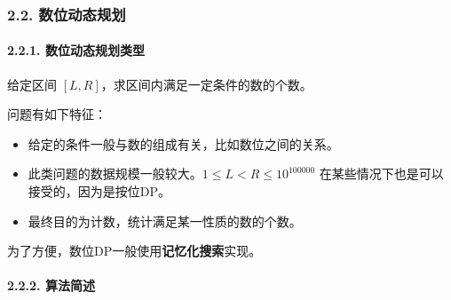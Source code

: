 \begin{Shaded}
\begin{Highlighting}[]
    \OperatorTok{=}\OperatorTok{;}
    \OperatorTok{(}\OperatorTok{=}\OperatorTok{;}\OperatorTok{\textless{}(}\OperatorTok{\textless{}\textless{}}\OperatorTok{);}\OperatorTok{++)}
    \OperatorTok{(}\OperatorTok{=}\OperatorTok{;}\OperatorTok{\textless{}(}\OperatorTok{\textless{}\textless{}}\OperatorTok{);}\OperatorTok{++)}
        \OperatorTok{((}\OperatorTok{\&}\OperatorTok{)==}\OperatorTok{)}\OperatorTok{(}\OperatorTok{,}\OperatorTok{[}\OperatorTok{][}\OperatorTok{]);}
\OperatorTok{\textless{}\textless{}}\OperatorTok{\textless{}\textless{}}\CharTok{\textquotesingle{}}\CharTok{\textquotesingle{}}\OperatorTok{;}
     \OperatorTok{;}
\OperatorTok{\}}
\end{Highlighting}
\end{Shaded}

\subsubsection{2.2. 数位动态规划}

\paragraph{2.2.1. 数位动态规划类型}

给定区间 \([L,R]\)，求区间内满足一定条件的数的个数。

问题有如下特征：

\begin{itemize}
\item
  给定的条件一般与数的组成有关，比如数位之间的关系。
\item
  此类问题的数据规模一般较大。\(1\leq L<R\leq 10^{100000}\)
  在某些情况下也是可以接受的，因为是按位DP。
\item
  最终目的为计数，统计满足某一性质的数的个数。
\end{itemize}

为了方便，数位DP一般使用\textbf{记忆化搜索}实现。

\paragraph{2.2.2. 算法简述}

